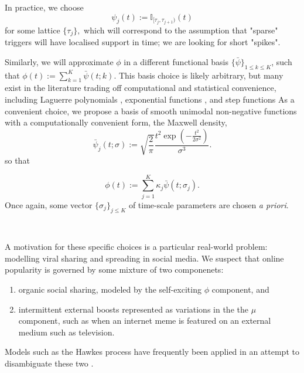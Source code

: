 \documentclass[11pt]{article}
\providecommand{\tightlist}{%
      \setlength{\itemsep}{0pt}\setlength{\parskip}{0pt}}
\newcommand{\bb}[1]{\mathbb{#1}}
\begin{document}
In practice, we choose
\[\psi_j(t) := \bb{I}_{[\tau_{j},\tau_{j+1})}(t)\] for some lattice
\(\{\tau_j\},\) which will correspond to the assumption that "sparse"
triggers will have localised support in time; we are looking for short
"spikes".

Similarly, we will approximate \(\phi\) in a different functional basis
\(\{\bar{\psi}\}_{1\leq k \leq K}\), such that
\(\phi(t):= \sum_{k=1}^K \bar{\psi}(t;k)\). This basis choice is likely
arbitrary, but many exist in the literature trading off computational
and statistical convenience, including Laguerre polynomials
\cite{ogata_linear_1982}, exponential functions
\cite{schoenberg_consistent_2005,rambaldi_modeling_2015}, and step
functions \cite{eichler_graphical_2016} As a convenient choice, we
propose a basis of smooth unimodal non-negative functions with a
computationally convenient form, the Maxwell density,
\[\bar{\psi}_j(t;\sigma):=\sqrt{\frac{2}{\pi}} \frac{t^2\exp\left(-\frac{t^2}{2\sigma^2}\right)}{\sigma^3}.\]
so that

\[\phi(t):= \sum_{j=1}^K \kappa_j\bar{\psi}(t;\sigma_j).\] Once again,
some vector \(\{\sigma_j\}_{j\leq K}\) of time-scale parameters are
chosen \emph{a priori}.


    \begin{center}
    \end{center}
    { \hspace*{\fill} \\}
    
    A motivation for these specific choices is a particular real-world
problem: modelling viral sharing and spreading in social media. We
suspect that online popularity is governed by some mixture of two
componenets:

\begin{enumerate}
\def\labelenumi{\arabic{enumi}.}
\tightlist
\item
  organic social sharing, modeled by the self-exciting \(\phi\)
  component, and
\item
  intermittent external boosts represented as variations in the the
  \(\mu\) component, such as when an internet meme is featured on an
  external medium such as television.
\end{enumerate}

Models such as the Hawkes process have frequently been applied in an
attempt to disambiguate these two
\cite{crane_robust_2008,mitchell_hawkes_2010,rizoiu_expecting_2017}.
\end{document}
